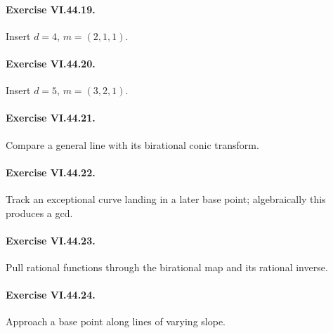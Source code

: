 \paragraph{Exercise VI.44.19.}
\begin{hint}
Insert \(d=4\), \(m=(2,1,1)\).
\end{hint}

\paragraph{Exercise VI.44.20.}
\begin{hint}
Insert \(d=5\), \(m=(3,2,1)\).
\end{hint}

\paragraph{Exercise VI.44.21.}
\begin{hint}
Compare a general line with its birational conic transform.
\end{hint}

\paragraph{Exercise VI.44.22.}
\begin{hint}
Track an exceptional curve landing in a later base point; algebraically this produces a gcd.
\end{hint}

\paragraph{Exercise VI.44.23.}
\begin{hint}
Pull rational functions through the birational map and its rational inverse.
\end{hint}

\paragraph{Exercise VI.44.24.}
\begin{hint}
Approach a base point along lines of varying slope.
\end{hint}
